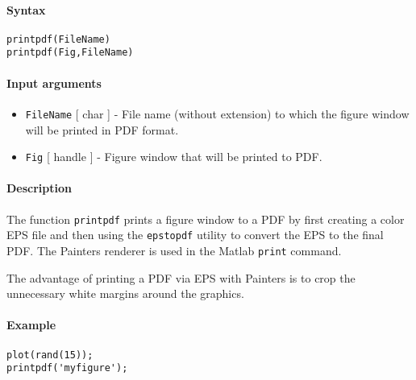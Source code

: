 


	\paragraph{Syntax}\label{syntax}

\begin{verbatim}
printpdf(FileName)
printpdf(Fig,FileName)
\end{verbatim}

\paragraph{Input arguments}\label{input-arguments}

\begin{itemize}
\item
  \texttt{FileName} {[} char {]} - File name (without extension) to
  which the figure window will be printed in PDF format.
\item
  \texttt{Fig} {[} handle {]} - Figure window that will be printed to
  PDF.
\end{itemize}

\paragraph{Description}\label{description}

The function \texttt{printpdf} prints a figure window to a PDF by first
creating a color EPS file and then using the \texttt{epstopdf} utility
to convert the EPS to the final PDF. The Painters renderer is used in
the Matlab \texttt{print} command.

The advantage of printing a PDF via EPS with Painters is to crop the
unnecessary white margins around the graphics.

\paragraph{Example}\label{example}

\begin{verbatim}
plot(rand(15));
printpdf('myfigure');
\end{verbatim}


